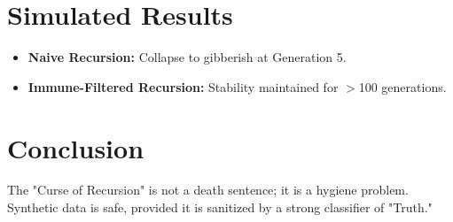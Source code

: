 \documentclass{article}
\begin{document}
\section{Simulated Results}
\begin{itemize}
    \item \textbf{Naive Recursion:} Collapse to gibberish at Generation 5.
    \item \textbf{Immune-Filtered Recursion:} Stability maintained for $>$100 generations.
\end{itemize}

\section{Conclusion}
The "Curse of Recursion" is not a death sentence; it is a hygiene problem. Synthetic data is safe, provided it is sanitized by a strong classifier of "Truth."

\printbibliography
\end{document}
